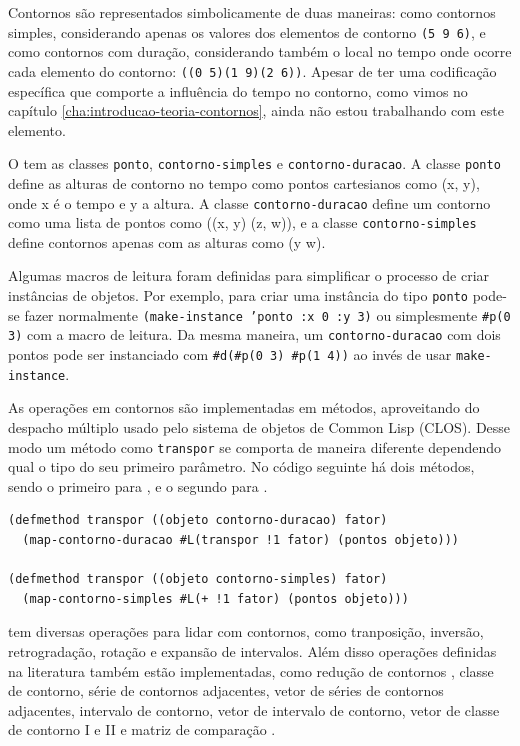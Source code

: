 Contornos são representados simbolicamente de duas maneiras: como
contornos simples, considerando apenas os valores dos elementos de
contorno \verb!(5 9 6)!, e como contornos com duração, considerando
também o local no tempo onde ocorre cada elemento do contorno:
\verb!((0 5)(1 9)(2 6))!. Apesar de ter uma codificação específica que
comporte a influência do tempo no contorno, como vimos no capítulo
\ref{cha:introducao-teoria-contornos}, ainda não estou trabalhando com
este elemento.

O \goiaba{} tem as classes \texttt{ponto}, \texttt{contorno-simples} e
\texttt{contorno-duracao}. A classe \texttt{ponto} define as alturas
de contorno no tempo como pontos cartesianos como (x, y), onde x é o
tempo e y a altura. A classe \texttt{contorno-duracao} define um
contorno como uma lista de pontos como ((x, y) (z, w)), e a classe
\texttt{contorno-simples} define contornos apenas com as alturas como
(y w).

Algumas macros de leitura foram definidas para simplificar o processo
de criar instâncias de objetos. Por exemplo, para criar uma instância
do tipo \texttt{ponto} pode-se fazer normalmente
\texttt{(make-instance 'ponto :x 0 :y 3)} ou simplesmente
\verb!#p(0 3)! com a macro de leitura. Da mesma maneira, um
\texttt{contorno-duracao} com dois pontos pode ser instanciado com
\verb!#d(#p(0 3) #p(1 4))! ao invés de usar \texttt{make-instance}.

As operações em contornos são implementadas em métodos, aproveitando
do despacho múltiplo usado pelo sistema de objetos de Common Lisp
(CLOS). Desse modo um método como \texttt{transpor} se comporta de
maneira diferente dependendo qual o tipo do seu primeiro parâmetro. No
código seguinte há dois métodos, sendo o primeiro para
, e o segundo para .

\break

\singlespacing
\begin{verbatim}
(defmethod transpor ((objeto contorno-duracao) fator)
  (map-contorno-duracao #L(transpor !1 fator) (pontos objeto)))

(defmethod transpor ((objeto contorno-simples) fator)
  (map-contorno-simples #L(+ !1 fator) (pontos objeto)))
\end{verbatim}
\doublespacing

\goiaba{} tem diversas operações para lidar com contornos, como
tranposição, inversão, retrogradação, rotação e expansão de
intervalos. Além disso operações definidas na literatura também estão
implementadas, como redução de contornos \cite{adams76:melodic},
classe de contorno, série de contornos adjacentes, vetor de séries de
contornos adjacentes, intervalo de contorno, vetor de intervalo de
contorno, vetor de classe de contorno I e II
\cite{friedmann85:methodology} e matriz de comparação
\cite{morris93:directions}.

